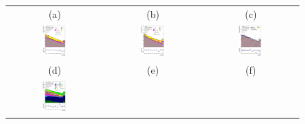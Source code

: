 \begin{figure}[H]
\begin{tabular}{@{}ccc@{}}
(a) & (b) & (c) \\
\includegraphics[page=1,width=0.28\textwidth]{figures/new_pt/log_or_nolog/tuH_reg1l1tau1b2j_os_log_.pdf}&
\includegraphics[page=1,width=0.28\textwidth]{figures/new_pt/log_or_nolog/tuH_reg1l1tau1b3j_os_log_.pdf} &
\includegraphics[page=1,width=0.28\textwidth]{figures/new_pt/log_or_nolog/tuH_reg1l2tau1bnj_ss_log_.pdf} \\
(d) & (e) & (f)\\
\includegraphics[page=1,width=0.28\textwidth]{figures/new_pt/log_or_nolog/tuH_reg2mtau1b2jos_log_.pdf}&

\end{tabular}
\end{figure}
